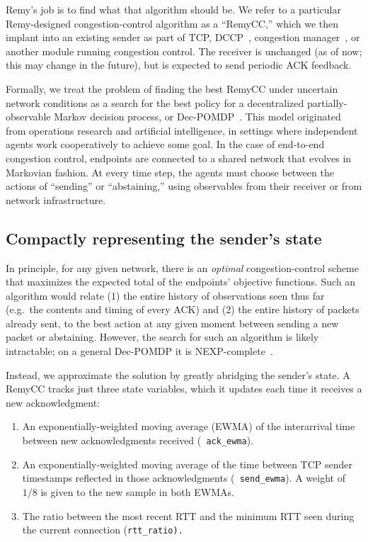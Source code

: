 Remy's job is to find what that algorithm should
be.  We refer to a particular Remy-designed congestion-control
algorithm as a ``RemyCC,'' which we then implant into an existing
sender as part of TCP, DCCP~\cite{dccp}, congestion manager~\cite{cm},
or another module running congestion control.  The receiver is
unchanged (as of now; this may change in the future), but is expected
to send periodic ACK feedback.

Formally, we treat the problem of finding the best RemyCC under
uncertain network conditions as a search for the best policy for a
decentralized partially-observable Markov decision
process, or Dec-POMDP~\cite{Oliehoek2012}. This model originated from operations
research and artificial intelligence, in settings where independent
agents work cooperatively to achieve some goal. In the case of
end-to-end congestion control, endpoints are connected to a shared
network that evolves in Markovian fashion. At every time step, the
agents must choose between the actions of ``sending'' or
``abstaining,'' using observables from their receiver or from network
infrastructure.

\subsection{Compactly representing the sender's state}

In principle, for any given network, there is an {\em optimal}
congestion-control scheme that maximizes the expected total of the
endpoints' objective functions. Such an algorithm would relate (1) the
entire history of observations seen thus far (e.g.~the
contents and timing of every ACK) and (2) the entire history of
packets already sent, to the best action at any given moment between sending a new packet or abstaining. However, the search for such an algorithm is likely
intractable; on a general Dec-POMDP it is
NEXP-complete~\cite{Bernstein2002}.

Instead, we approximate the solution by greatly abridging the sender's
state. A RemyCC tracks just three state variables, which it updates
each time it receives a new acknowledgment:

\begin{enumerate}

\item An exponentially-weighted moving average (EWMA) of the
  interarrival time between new acknowledgments received ({\tt
    ack\_ewma}).

\item An exponentially-weighted moving average of the time between TCP
  sender timestamps reflected in those acknowledgments ({\tt
    send\_ewma}). A weight of $1/8$ is given to the new sample in both
  EWMAs.

\item The ratio between the most recent RTT and the minimum RTT seen
  during the current connection (\tt{rtt\_ratio}).

\end{enumerate}

